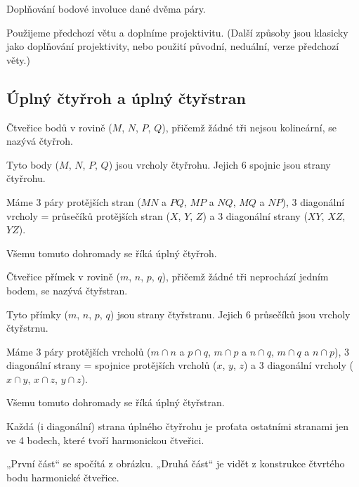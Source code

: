 \documentclass[12pt]{article}					%
\begin{document}
\begin{priklad}
	Doplňování bodové involuce dané dvěma páry.

	\begin{reseni}
		Použijeme předchozí větu a doplníme projektivitu. (Další způsoby jsou klasicky jako doplňování projektivity, nebo použití původní, neduální, verze předchozí věty.)
	\end{reseni}
\end{priklad}

\subsection{Úplný čtyřroh a úplný čtyřstran}
\begin{definice}
	Čtveřice bodů v rovině ($M$, $N$, $P$, $Q$), přičemž žádné tři nejsou kolineární, se nazývá čtyřroh.

	Tyto body ($M$, $N$, $P$, $Q$) jsou vrcholy čtyřrohu. Jejich 6 spojnic jsou strany čtyřrohu.

	Máme 3 páry protějších stran ($MN$ a $PQ$, $MP$ a $NQ$, $MQ$ a $NP$), 3 diagonální vrcholy = průsečíků protějších stran ($X$, $Y$, $Z$) a 3 diagonální strany ($XY$, $XZ$, $YZ$).

	Všemu tomuto dohromady se říká úplný čtyřroh.
\end{definice}

\begin{definice}
	Čtveřice přímek v rovině ($m$, $n$, $p$, $q$), přičemž žádné tři neprochází jedním bodem, se nazývá čtyřstran.

	Tyto přímky ($m$, $n$, $p$, $q$) jsou strany čtyřstranu. Jejich 6 průsečíků jsou vrcholy čtyřstrnu.

	Máme 3 páry protějších vrcholů ($m \cap n$ a $p \cap q$, $m \cap p$ a $n \cap q$, $m \cap q$ a $n \cap p$), 3 diagonální strany = spojnice protějších vrcholů ($x$, $y$, $z$) a 3 diagonální vrcholy ($x \cap y$, $x \cap z$, $y \cap z$).

	Všemu tomuto dohromady se říká úplný čtyřstran.
\end{definice}

\begin{veta}
	Každá (i diagonální) strana úplného čtyřrohu je proťata ostatními stranami jen ve 4 bodech, které tvoří harmonickou čtveřici.

	\begin{dukazin}
		„První část“ se spočítá z obrázku. „Druhá část“ je vidět z konstrukce čtvrtého bodu harmonické čtveřice.
	\end{dukazin}
\end{veta}
\end{document}
